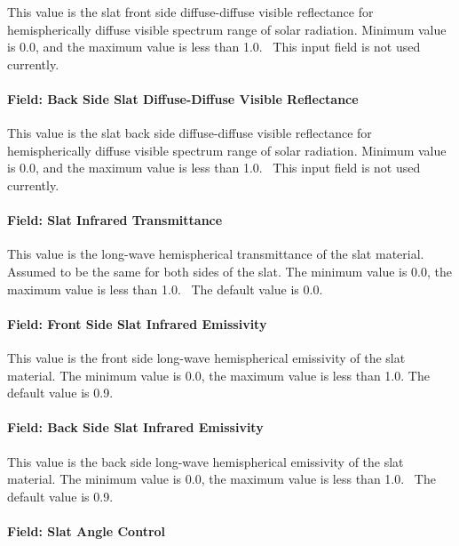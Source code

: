 This value is the slat front side diffuse-diffuse visible reflectance for hemispherically diffuse visible spectrum range of solar radiation. Minimum value is 0.0, and the maximum value is less than 1.0.~ This input field is not used currently.

\paragraph{Field: Back Side Slat Diffuse-Diffuse Visible Reflectance}\label{field-back-side-slat-diffuse-diffuse-visible-reflectance}

This value is the slat back side diffuse-diffuse visible reflectance for hemispherically diffuse visible spectrum range of solar radiation. Minimum value is 0.0, and the maximum value is less than 1.0.~ This input field is not used currently.

\paragraph{Field: Slat Infrared Transmittance}\label{field-slat-infrared-transmittance}

This value is the long-wave hemispherical transmittance of the slat material. Assumed to be the same for both sides of the slat. The minimum value is 0.0, the maximum value is less than 1.0.~ The default value is 0.0.

\paragraph{Field: Front Side Slat Infrared Emissivity}\label{field-front-side-slat-infrared-emissivity}

This value is the front side long-wave hemispherical emissivity of the slat material. The minimum value is 0.0, the maximum value is less than 1.0. The default value is 0.9.

\paragraph{Field: Back Side Slat Infrared Emissivity}\label{field-back-side-slat-infrared-emissivity}

This value is the back side long-wave hemispherical emissivity of the slat material. The minimum value is 0.0, the maximum value is less than 1.0.~ The default value is 0.9.

\paragraph{Field: Slat Angle Control}\label{field-slat-angle-control}

